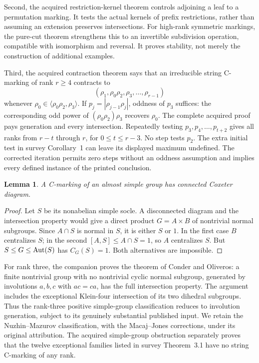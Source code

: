 \documentclass[11pt]{article}
\newtheorem{lemma}[theorem]{Lemma}\newtheorem{corollary}[theorem]{Corollary}
\newcommand{\gen}[1]{\langle#1\rangle}
\newcommand{\note}[1]{\marginpar{\raggedright\scriptsize #1}}
\begin{document}
Second, the acquired restriction-kernel theorem controls adjoining a
leaf to a permutation marking. It tests the actual kernels of prefix
restrictions, rather than assuming an extension preserves intersections.
For high-rank symmetric markings, the pure-cut theorem strengthens
this to an invertible subdivision operation, compatible with isomorphism
and reversal. It proves stability, not merely the construction of
additional examples.

Third, the acquired contraction theorem says that an irreducible
string C-marking of rank $r\ge4$ contracts to
\[
              (\rho_1,\rho_0\rho_2,\rho_3,\ldots,\rho_{r-1})
\]
whenever $\rho_0\in\gen{\rho_0\rho_2,\rho_3}$. If
$p_j=|\rho_{j-1}\rho_j|$, oddness of $p_3$ suffices: the corresponding
odd power of $(\rho_0\rho_2)\rho_3$ recovers $\rho_0$.
The complete acquired proof pays generation and every intersection.
Repeatedly testing $p_3,p_4,\ldots,p_{t+2}$ gives all ranks from
$r-t$ through $r$, for $0\le t\le r-3$.
\note{Reuse}
No step tests $p_2$. The extra initial test in survey Corollary~1 can
leave its displayed maximum undefined. The corrected iteration permits
zero steps without an oddness assumption and implies every defined
instance of the printed conclusion.

\begin{lemma}\label{connected}
A C-marking of an almost simple group has connected Coxeter diagram.
\end{lemma}
\begin{proof}
Let $S$ be its nonabelian simple socle. A disconnected diagram and
the intersection property would give a direct product $G=A\times B$
of nontrivial normal subgroups. Since $A\cap S$ is normal in $S$, it
is either $S$ or $1$. In the first case $B$ centralizes $S$; in the
second $[A,S]\le A\cap S=1$, so $A$ centralizes $S$. But
$S\le G\le\operatorname{Aut}(S)$ has $C_G(S)=1$. Both alternatives are impossible.
\end{proof}

For rank three, the companion proves the theorem of Conder and
Oliveros: a finite nontrivial group with no nontrivial cyclic normal
subgroup, generated by involutions $a,b,c$ with $ac=ca$, has the full
intersection property. The argument includes the exceptional
Klein-four intersection of its two dihedral subgroups. Thus the
rank-three positive simple-group classification reduces to involution
generation, subject to its genuinely substantial published input.
We retain the Nuzhin--Mazurov classification, with the Macaj--Jones
corrections, under its original attribution. The acquired simple-group
obstruction separately proves that the twelve exceptional families
listed in survey Theorem~3.1 have no string C-marking of any rank.
\end{document}
